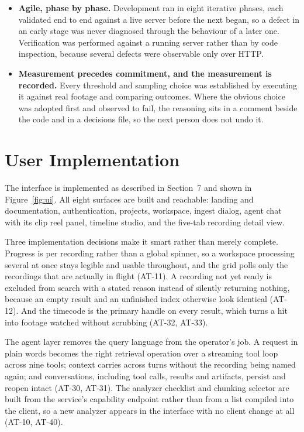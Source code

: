 \documentclass[11pt,a4paper]{article}
\begin{document}
\begin{itemize}
  \item \textbf{Agile, phase by phase.} Development ran in eight iterative
        phases, each validated end to end against a live server before the next
        began, so a defect in an early stage was never diagnosed through the
        behaviour of a later one. Verification was performed against a running
        server rather than by code inspection, because several defects were
        observable only over HTTP.

  \item \textbf{Measurement precedes commitment, and the measurement is
        recorded.} Every threshold and sampling choice was established by
        executing it against real footage and comparing outcomes. Where the
        obvious choice was adopted first and observed to fail, the reasoning sits
        in a comment beside the code and in a decisions file, so the next person
        does not undo it.
\end{itemize}

\section{User Implementation}

The interface is implemented as described in Section~7 and shown in
Figure~\ref{fig:ui}. All eight surfaces are built and reachable: landing and
documentation, authentication, projects, workspace, ingest dialog, agent chat
with its clip reel panel, timeline studio, and the five-tab recording detail
view.

Three implementation decisions make it smart rather than merely complete.
Progress is per recording rather than a global spinner, so a workspace
processing several at once stays legible and usable throughout, and the grid
polls only the recordings that are actually in flight (AT-11). A recording not
yet ready is excluded from search with a stated reason instead of silently
returning nothing, because an empty result and an unfinished index otherwise
look identical (AT-12). And the timecode is the primary handle on every result,
which turns a hit into footage watched without scrubbing (AT-32, AT-33).

The agent layer removes the query language from the operator's job. A request in
plain words becomes the right retrieval operation over a streaming tool loop
across nine tools; context carries across turns without the recording being
named again; and conversations, including tool calls, results and artifacts,
persist and reopen intact (AT-30, AT-31). The analyzer checklist and chunking
selector are built from the service's capability endpoint rather than from a
list compiled into the client, so a new analyzer appears in the interface with
no client change at all (AT-10, AT-40).
\end{document}
